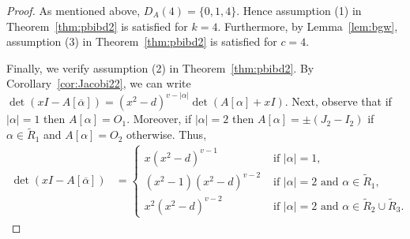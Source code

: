 \documentclass[11pt]{article}
\begin{document}
\begin{proof}
As mentioned above, $D_A(4)=\{0,1,4\}$.
Hence assumption (1) in Theorem~\ref{thm:pbibd2} is satisfied for $k=4$.  
Furthermore, by Lemma~\ref{lem:bgw}, assumption (3) in Theorem~\ref{thm:pbibd2} is satisfied for $c = 4$.

Finally, we verify assumption (2) in Theorem~\ref{thm:pbibd2}.  
By Corollary~\ref{cor:Jacobi22}, we can write $\det(xI-A[\overline \alpha]) = (x^2-d)^{v-|\alpha|}\det(A[\alpha]+xI)$.
Next, observe that if $|\alpha| = 1$ then $A[\alpha] = O_1$.
Moreover, if $|\alpha| = 2$ then $A[\alpha] = \pm(J_2 - I_2)$ if $\alpha \in \tilde R_1$ and $A[\alpha] = O_2$ otherwise.
Thus,
\begin{align}
\det(xI-A[\overline \alpha])
&=\begin{cases}
x(x^2-d)^{v-1}&\text{ if }|\alpha|=1,\\ 
(x^2-1)(x^2-d)^{v-2}&\text{ if }|\alpha|=2\text{ and }\alpha\in\tilde{R}_1,
\\ 
x^2(x^2-d)^{v-2}&\text{ if }|\alpha|=2\text{ and }\alpha\in\tilde{R}_2\cup \tilde{R}_3.
\end{cases}\label{eq:bgw}
\end{align}  

\end{proof}
\end{document}
